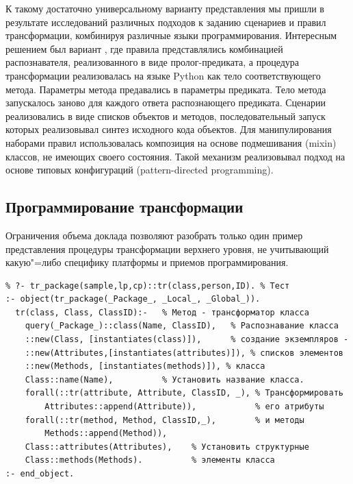 \documentclass[12pt]{article}
\begin{document}
К такому достаточно универсальному варианту представления мы пришли в результате исследований различных подходов к заданию сценариев и правил трансформации, комбинируя различные языки программирования.  Интересным решением был вариант \cite{b2}, где правила представлялись комбинацией распознавателя, реализованного в виде пролог-предиката, а процедура трансформации реализовалась на языке Python как тело соответствующего метода.  Параметры метода предавались в параметры предиката.  Тело метода запускалось заново для каждого ответа распознающего предиката.  Сценарии реализовались в виде списков объектов и методов, последовательный запуск которых реализовывал синтез исходного кода объектов.  Для манипулирования наборами правил использовалась композиция на основе подмешивания (mixin) классов, не имеющих своего состояния.  Такой механизм реализовывал подход на основе типовых конфигураций (pattern-directed programming).

\subsection{Программирование трансформации}

Ограничения объема доклада позволяют разобрать только один пример представления процедуры трансформации верхнего уровня, не учитывающий какую"=либо специфику платформы и приемов программирования.
\begin{verbatim}
% ?- tr_package(sample,lp,cp)::tr(class,person,ID). % Тест
:- object(tr_package(_Package_, _Local_, _Global_)).
  tr(class, Class, ClassID):-   % Метод - трансформатор класса
    query(_Package_)::class(Name, ClassID),   % Распознавание класса
    ::new(Class, [instantiates(class)]),      % создание экземпляров -
    ::new(Attributes,[instantiates(attributes)]), % списков элементов
    ::new(Methods, [instantiates(methods)]), % класса
    Class::name(Name),          % Установить название класса.
    forall(::tr(attribute, Attribute, ClassID, _), % Трансформировать
        Attributes::append(Attribute)),            % его атрибуты
    forall(::tr(method, Method, ClassID,_),        % и методы
        Methods::append(Method)),
    Class::attributes(Attributes),    % Установить структурные
    Class::methods(Methods).          % элементы класса
:- end_object.
\end{verbatim}
\end{document}
